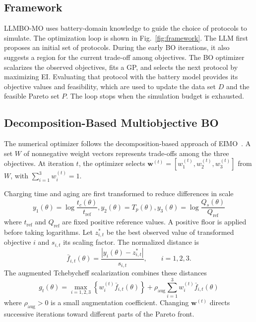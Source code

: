 \documentclass[journal]{IEEEtran}
\begin{document}
\subsection{Framework}
\label{sec:framework}

LLMBO-MO uses battery-domain knowledge to guide the choice of protocols to
simulate. The optimization loop is shown in Fig.~\ref{fig:framework}. The LLM
first proposes an initial set of protocols. During the early BO iterations,
it also suggests a region for the current trade-off among objectives. The BO
optimizer scalarizes the observed objectives, fits a GP, and selects the next
protocol by maximizing EI. Evaluating that protocol with the battery model
provides its objective values and feasibility, which are used to update the
data set $D$ and the feasible Pareto set $P$. The loop stops when the
simulation budget is exhausted.

\subsection{Decomposition-Based Multiobjective BO}
\label{sec:parego_backbone}

The numerical optimizer follows the decomposition-based approach of
EIMO~\cite{refEIMO}. A set $W$ of nonnegative weight vectors represents
trade-offs among the three objectives. At iteration $t$, the optimizer selects
$\mathbf w^{(t)}=[w_1^{(t)},w_2^{(t)},w_3^{(t)}]$ from $W$, with
$\sum_{i=1}^{3}w_i^{(t)}=1$.

Charging time and aging are first transformed to reduce differences in scale
\begin{equation}
 y_1(\theta)=\log\!\frac{t_c(\theta)}{t_{\mathrm{ref}}},
 y_2(\theta)=T_p(\theta),
 y_3(\theta)=\log\!\frac{Q_s(\theta)}{Q_{\mathrm{ref}}}
 \label{eq:objective_transform}
\end{equation}
where $t_{\mathrm{ref}}$ and $Q_{\mathrm{ref}}$ are fixed positive reference
values. A positive floor is applied before taking logarithms. Let
$z_{i,t}^{*}$ be the best observed value of transformed objective $i$ and
$s_{i,t}$ its scaling factor. The normalized distance is
\begin{equation}
 \bar f_{i,t}(\theta)=
 \frac{|y_i(\theta)-z_{i,t}^{*}|}{s_{i,t}},\qquad i=1,2,3.
 \label{eq:objective_scaling}
\end{equation}
The augmented Tchebycheff scalarization combines these distances
\begin{equation}
 g_t(\theta)=
 \max_{i=1,2,3}\!\left\{w_i^{(t)}\bar f_{i,t}(\theta)\right\}
 +\rho_{\mathrm{aug}}\sum_{i=1}^{3}w_i^{(t)}\bar f_{i,t}(\theta)
 \label{eq:tchebycheff}
\end{equation}
where $\rho_{\mathrm{aug}}>0$ is a small augmentation coefficient. Changing
$\mathbf w^{(t)}$ directs successive iterations toward different parts of the
Pareto front.
\end{document}
